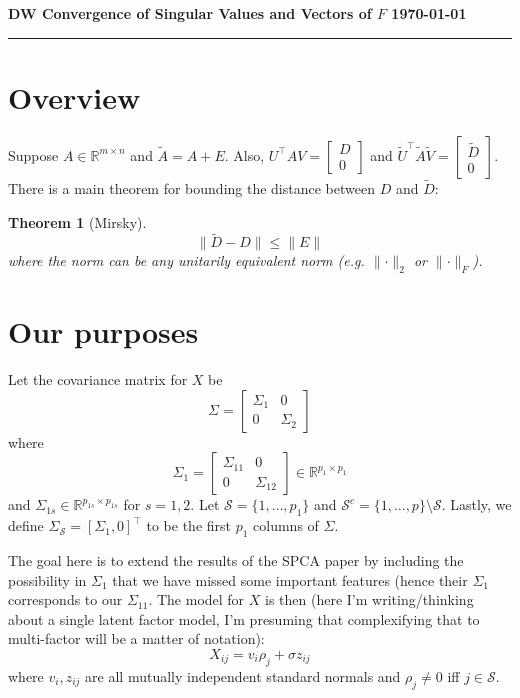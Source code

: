\documentclass[11pt]{article}
\newtheorem{theorem}{Theorem}[section]
\newcommand{\R}{\mathbb{R}}
\newcommand{\norm}[1]{\lVert #1 \rVert}
\renewcommand{\S}{\mathcal{S}}
\begin{document}
\noindent\textbf{\sc DW
        \hfill Convergence of Singular Values and Vectors of $F$
        \hfill \today}
\rule{6.5in}{1pt}
\section{Overview}
Suppose $A \in \R^{m\times n}$ and $\tilde{A} = A + E$.  Also, $U^{\top}AV = \begin{bmatrix} D \\ 0 \end{bmatrix}$ and $\tilde{U}^{\top}\tilde{A}\tilde{V} = \begin{bmatrix} \tilde{D} \\ 0 \end{bmatrix}$.
There is a main theorem for bounding the distance between $D$ and $\tilde{D}$:

\begin{theorem}[Mirsky]
\[
\norm{\tilde{D} - D} \leq \norm{E}
\]
where the norm can be any unitarily equivalent norm (e.g. $\norm{\cdot}_2$ or $\norm{\cdot}_F$).
\end{theorem}

\section{Our purposes}
Let the covariance matrix for $X$ be
\[
\Sigma 
= 
 \begin{bmatrix} 
 \Sigma_{1} & 0  \\ 0 & \Sigma_2 
 \end{bmatrix}
\]
where
\[
\Sigma_1 
= 
 \begin{bmatrix} 
 \Sigma_{11} & 0  \\ 0 & \Sigma_{12} 
 \end{bmatrix} \in \R^{p_1 \times p_1}
\]
and $\Sigma_{1s} \in \R^{p_{1s} \times p_{1s}}$ for $s = 1,2$.  Let $\S = \{1,\ldots,p_1\}$ and $\S^c = \{1,\ldots,p\} \setminus \S$.  Lastly, we define $\Sigma_\S = [\Sigma_1, 0]^{\top}$
to be the first $p_1$ columns of $\Sigma$.

The goal here is to extend the results of the SPCA paper by including the possibility in $\Sigma_1$ that we have missed some important features  (hence their $\Sigma_1$ corresponds 
to our $\Sigma_{11}$.  The model for $X$ is then (here I'm writing/thinking about a single latent factor model, I'm presuming that complexifying that to multi-factor will be a matter
of notation):
\[
X_{ij} = v_i \rho_j + \sigma z_{ij}
\]
where $v_i,z_{ij}$ are all mutually independent standard normals and $\rho_j \neq 0$ iff $j \in \S$.
\end{document}
